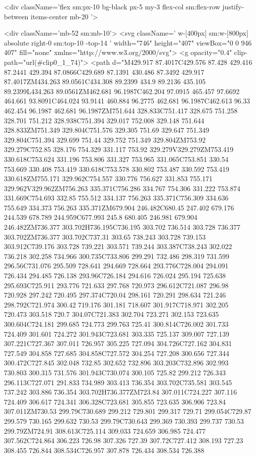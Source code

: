 <div className='flex sm:px-10 bg-black  px-5 my-3 flex-col sm:flex-row justify-between items-center mb-20  '> 
        
                <div className='mb-52  sm:mb-10'>
                    <svg className=' w-[400px] sm:w-[800px] absolute right-0 sm:top-10 -top-14   ' width="746" height="407" viewBox="0 0 946 407" fill="none" xmlns="http://www.w3.org/2000/svg">
<g opacity="0.4" clip-path="url(#clip0_1_74)">
<path d="M429.917 87.4017C429.576 87.428 429.416 87.2441 429.394 87.0866C429.689 87.1391 430.486 87.3492 429.917 87.4017ZM434.263 89.0561C434.308 89.2399 434.9 89.2136 435.105 89.2399L434.263 89.0561ZM462.681 96.1987C462.204 97.0915 465.457 97.6692 464.661 93.8091C464.024 93.9141 460.884 96.2775 462.681 96.1987C462.613 96.33 462.454 96.1987 462.681 96.1987ZM751.644 328.833C751.417 328.675 751.258 328.701 751.212 328.938C751.394 329.017 752.008 329.148 751.644 328.833ZM751.349 329.804C751.576 329.305 751.69 329.647 751.349 329.804C751.394 329.699 751.44 329.752 751.349 329.804ZM753.92 329.279C752.85 328.176 754.329 331.117 753.92 329.279V329.279ZM753.419 330.618C753.624 331.196 753.806 331.327 753.965 331.065C753.851 330.54 753.669 330.408 753.419 330.618C753.578 330.802 753.487 330.592 753.419 330.618ZM755.171 329.962C754.557 330.776 756.627 331.853 755.171 329.962V329.962ZM756.263 335.371C756.286 334.767 754.306 331.222 753.874 331.669C754.693 332.85 755.512 334.137 756.263 335.371C756.309 334.636 755.649 334.373 756.263 335.371ZM679.904 246.482C680.45 247.402 679.176 244.539 678.789 244.959C677.993 245.8 680.405 246.981 679.904 246.482ZM736.377 303.702H736.195C736.195 303.702 736.514 303.728 736.377 303.702ZM736.377 303.702C737.31 303.65 738.243 303.728 739.153 303.912C739.176 303.728 739.221 303.571 739.244 303.387C738.243 302.022 736.218 302.258 734.966 300.735C733.806 299.291 732.486 298.319 731.599 296.56C731.076 295.509 728.641 294.669 728.664 293.776C728.004 294.091 726.434 294.485 726.138 293.96C726.184 294.616 726.024 295.194 725.638 295.693C725.911 293.776 721.633 297.768 720.973 296.612C721.087 296.98 720.928 297.242 720.495 297.374C720.04 298.161 720.291 298.634 721.246 298.792C721.974 300.42 719.176 301.181 718.607 301.917C718.971 302.205 720.473 303.518 720.7 304.07C721.383 302.704 723.271 302.153 723.635 300.604C724.181 299.685 724.773 299.763 725.41 300.814C726.002 301.733 724.409 301.601 724.272 301.943C723.681 303.335 725.137 309.007 727.139 307.221C727.367 307.011 726.957 305.225 727.094 304.726C727.162 304.831 727.549 304.858 727.685 304.858C727.572 304.254 727.208 300.656 727.344 300.472C727.845 302.048 732.85 302.652 732.896 303.203C732.896 302.993 730.803 300.315 731.576 301.943C730.074 300.105 725.82 299.212 726.343 296.113C727.071 291.833 734.989 303.413 736.354 303.702C735.581 303.545 737.242 303.886 736.354 303.702H736.377ZM723.84 307.011C724.227 307.116 724.409 306.617 724.341 306.328C723.681 305.855 723.635 306.906 723.84 307.011ZM730.53 299.79C730.689 299.212 729.801 299.317 729.71 299.054C729.87 299.579 730.165 299.632 730.53 299.79C730.643 299.369 730.393 299.737 730.53 299.79ZM724.91 308.613C725.114 309.033 724.659 306.985 724.477 307.562C724.864 306.223 726.98 307.326 727.39 307.72C727.412 308.193 727.23 308.455 726.844 308.534C726.957 307.878 726.434 308.534 726.388 